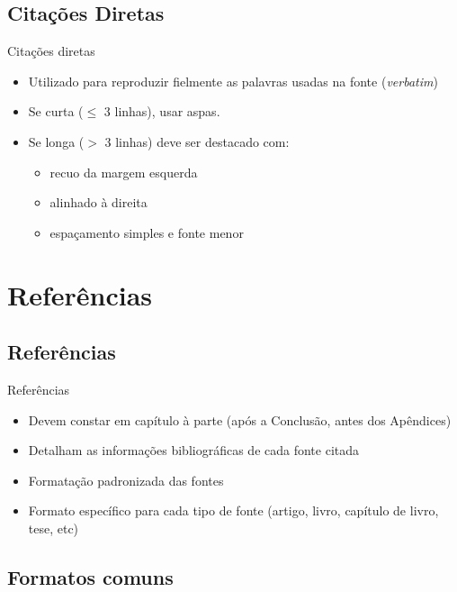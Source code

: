 \documentclass{beamer}
\begin{document}
\subsection{Citações Diretas}

\begin{frame}{Citações diretas}
  \begin{itemize}
  \item Utilizado para reproduzir fielmente as palavras usadas na
    fonte ({\em verbatim})
  \item Se curta ($\leq$ 3 linhas), usar aspas.
  \item Se longa ($>$ 3 linhas) deve ser destacado com:
    \begin{itemize}
    \item recuo da margem esquerda
    \item alinhado à direita
    \item espaçamento simples e fonte menor
    \end{itemize}
  \end{itemize}
\end{frame}

\section{Referências}

\subsection{Referências}

\begin{frame}{Referências}
  \begin{itemize}
  \item Devem constar em capítulo à parte (após a Conclusão, antes dos
    Apêndices)
  \item Detalham as informações bibliográficas de cada fonte citada
  \item Formatação padronizada das fontes
  \item Formato específico para cada tipo de fonte (artigo, livro,
    capítulo de livro, tese, etc)
  \end{itemize}
\end{frame}
\subsection{Formatos comuns}
\end{document}
